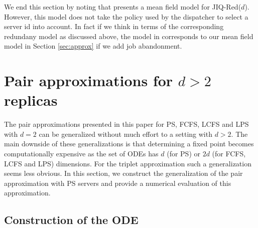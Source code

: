 \documentclass[acmsmall,nonacm]{acmart}
\begin{document}
We end this section by noting that  \cite{Harte} presents a mean field model for JIQ-Red($d$). However, this
model does not take the policy used by the dispatcher to select a server id into account. In fact if we think in terms
of the corresponding redundany model as discussed above, the model in \cite{Harte} corresponds to our
mean field model in Section \ref{sec:approx} if we add job abandonment.

\section{Pair approximations for $d>2$ replicas}\label{apx:d>2}
The pair approximations presented in this paper for PS, FCFS, LCFS and LPS with $d=2$ can
be generalized without much effort to a setting with $d>2$. The main downside of these generalizations
is that determining a fixed point becomes computationally expensive as the set of ODEs has
$d$ (for PS) or $2d$ (for FCFS, LCFS and LPS) dimensions.
For the triplet approximation such a generalization seems less obvious. In this section, we construct the generalization of the pair approximation with PS servers and provide a numerical evaluation of this approximation.

\subsection{Construction of the ODE}
\end{document}
